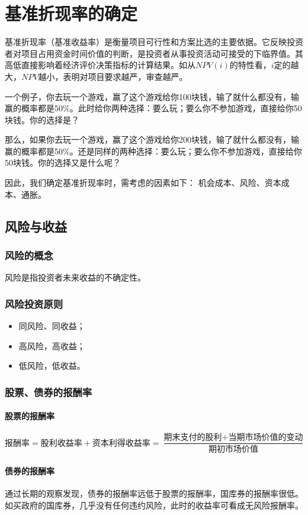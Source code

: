 \chapter{基准折现率的确定}
基准折现率（基准收益率）是衡量项目可行性和方案比选的主要依据。它反映投资者对项目占用资金时间价值的判断，是投资者从事投资活动可接受的下临界值。其高低直接影响着经济评价决策指标的计算结果。如从$NPV(i)$的特性看，$i$定的越大，$NPV$越小，表明对项目要求越严，审查越严。

一个例子，你去玩一个游戏，赢了这个游戏给你100块钱，输了就什么都没有，输赢的概率都是50\%。此时给你两种选择：要么玩；要么你不参加游戏，直接给你50块钱。你的选择是？

那么，如果你去玩一个游戏，赢了这个游戏给你200块钱，输了就什么都没有，输赢的概率都是50\%。还是同样的两种选择：要么玩；要么你不参加游戏，直接给你50块钱。你的选择又是什么呢？

因此，我们确定基准折现率时，需考虑的因素如下：
机会成本、风险、资本成本、通胀。

\section{风险与收益}
\subsection{风险的概念}
风险是指投资者未来收益的不确定性。
\subsection{风险投资原则}
\begin{itemize}
    \item 同风险、同收益；
    \item 高风险，高收益；
    \item 低风险，低收益。
\end{itemize}

\subsection{股票、债券的报酬率}
\subsubsection{股票的报酬率}
$$\mbox{报酬率}=\mbox{股利收益率}+\mbox{资本利得收益率}=\frac{\mbox{期末支付的股利}+\mbox{当期市场价值的变动}}{\mbox{期初市场价值}}$$

\subsubsection{债券的报酬率}
通过长期的观察发现，债券的报酬率远低于股票的报酬率，国库券的报酬率很低。如买政府的国库券，几乎没有任何违约风险，此时的收益率可看成无风险报酬率。

